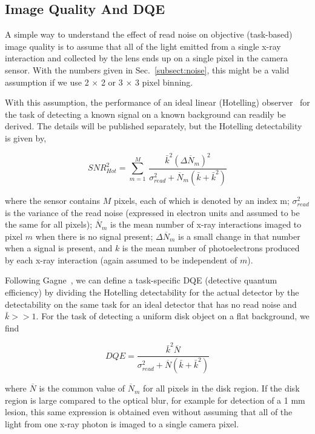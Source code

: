 \subsection{Image Quality And DQE}
\label{subsect:image_quality_DQE}
A simple way to understand the effect of read noise on objective (task-based) image quality is to assume that all of the light emitted from a single x-ray interaction and collected by the lens ends up on a single pixel in the camera sensor. With the numbers given in Sec.~\ref{subsect:noise}, this might be a valid assumption if we use 2 $\times$ 2 or 3 $\times$ 3 pixel binning. 

With this assumption, the performance of an ideal linear (Hotelling) observer~\citep{Barrett2004} for the task of detecting a known signal on a known background can readily be derived. The details will be published separately, but the Hotelling detectability is given by,

\begin{equation}
SNR_{Hot}^2 = \sum\limits_{m=1}^{M}\, \frac{\bar{k}^2 (\Delta \overline{N}_m)^2}{\sigma_{read}^2 + \overline{N}_m (\bar{k} + \bar{k}^2)}
\label{eq:SNR2_hot}
\end{equation}

\noindent where the sensor contains $M$ pixels, each of which is denoted by an index m; $\sigma_{read}^2$ is the variance of the read noise (expressed in electron units and assumed to be the same for all pixels); $\overline{N}_m$ is the mean number of x-ray interactions imaged to pixel $m$ when there is no signal present; $\Delta \overline{N}_m$ is a small change in that number when a signal is present, and $k$ is the mean number of photoelectrons produced by each x-ray interaction (again assumed to be independent of $m$).

Following Gagne~\citep{Gagne2003}, we can define a task-specific DQE (detective quantum efficiency) by dividing the Hotelling detectability for the actual detector by the detectability on the same task for an ideal detector that has no read noise and $\bar{k}>> 1$.  For the task of detecting a uniform disk object on a flat background, we find

\begin{equation}
DQE = \frac{\bar{k}^2 \overline{N}}{\sigma_{read}^2 + \overline{N}(\bar{k} + \bar{k}^2)}
\label{eq:DQE}
\end{equation}

\noindent where $\overline{N}$ is the common value of $\overline{N}_m$ for all pixels in the disk region. If the disk region is large compared to the optical blur, for example for detection of a 1 mm lesion, this same expression is obtained even without assuming that all of the light from one x-ray photon is imaged to a single camera pixel.

